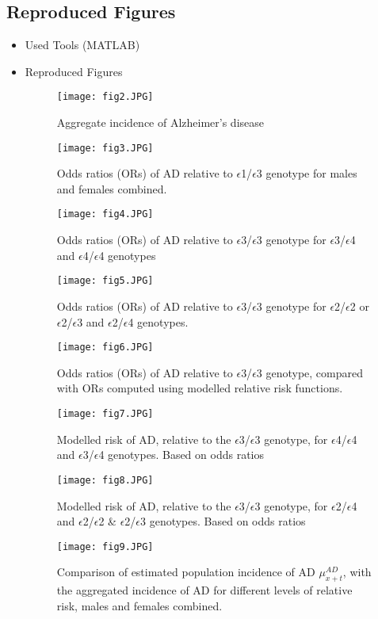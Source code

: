 \documentclass{article}
\begin{document}
\subsection{Reproduced Figures}
\begin{itemize}
\item Used Tools (MATLAB)
\item Reproduced Figures
    \begin{figure}[htp]
    \centering
    \texttt{[image: fig2.JPG]}
    \caption{Aggregate incidence of Alzheimer's disease}
    \label{fig:Plot}
\end{figure}

    \begin{figure}[htp]
    \centering
    \texttt{[image: fig3.JPG]}
    \caption{Odds ratios (ORs) of AD relative to $\epsilon$1/$\epsilon$3 genotype for males and females combined.}
    \label{fig:Plot}
\end{figure}
    \begin{figure}[htp]
    \centering
    \texttt{[image: fig4.JPG]}
    \caption{Odds ratios (ORs) of AD relative to $\epsilon$3/$\epsilon$3 genotype for $\epsilon$3/$\epsilon$4 and $\epsilon$4/$\epsilon$4 genotypes}
    \label{fig:Plot}
\end{figure}
    \begin{figure}[htp]
    \centering
    \texttt{[image: fig5.JPG]}
    \caption{Odds ratios (ORs) of AD relative to $\epsilon$3/$\epsilon$3 genotype for $\epsilon$2/$\epsilon$2 or $\epsilon$2/$\epsilon$3 and $\epsilon$2/$\epsilon$4 genotypes.}
    \label{fig:Plot}
\end{figure}
    \begin{figure}[htp]
    \centering
    \texttt{[image: fig6.JPG]}
    \caption{Odds ratios (ORs) of AD relative to $\epsilon$3/$\epsilon$3 genotype, compared with ORs
computed using modelled relative risk functions.}
    \label{fig:Plot}
\end{figure}
    \begin{figure}[htp]
    \centering
    \texttt{[image: fig7.JPG]}
    \caption{Modelled risk of AD, relative to the $\epsilon$3/$\epsilon$3 genotype, for $\epsilon$4/$\epsilon$4 and $\epsilon$3/$\epsilon$4 genotypes. Based on
odds ratios}
    \label{fig:Plot}
\end{figure}
    \begin{figure}[htp]
    \centering
    \texttt{[image: fig8.JPG]}
    \caption{Modelled risk of AD, relative to the $\epsilon$3/$\epsilon$3 genotype, for $\epsilon$2/$\epsilon$4 and $\epsilon$2/$\epsilon$2 & $\epsilon$2/$\epsilon$3 genotypes. Based on odds ratios}
    \label{fig:Plot}
\end{figure}
    \begin{figure}[htp]
    \centering
    \texttt{[image: fig9.JPG]}
    \caption{Comparison of estimated population incidence of AD $\mu^{AD}_{x+t}$, with the aggregated incidence of AD for different levels of relative risk, males and females combined.}
    \label{fig:Plot}
\end{figure}
\end{itemize}
\newpage
\end{document}
